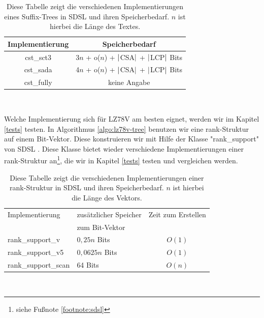 \documentclass[a4paper,11pt]{scrartcl}%
\theoremstyle{change}
\theoremstyle{nonumberplain}
\theoremstyle{change}
\theoremstyle{nonumberplain}
\theoremstyle{change}
\theoremstyle{nonumberplain}
\begin{document}
\begin{table}[h]
		\begin{center}
		
		\begin{tabular}[h]{|c|c|}\hline
			Implementierung & Speicherbedarf   \\ \hline
 		 	cst\_sct3 &  3$n$ + o($n$) + $\arrowvert$CSA$\arrowvert$ + $\arrowvert$LCP$\arrowvert$ Bits \\ \hline
 		 	cst\_sada &  4$n$ + o($n$) + $\arrowvert$CSA$\arrowvert$ + $\arrowvert$LCP$\arrowvert$ Bits \\ \hline
 		 	cst\_fully & keine Angabe \\ \hline
		\end{tabular} \\
		
		
		
		\end{center} 
		
		\caption{Diese Tabelle zeigt die verschiedenen Implementierungen eines Suffix-Trees in SDSL und ihren Speicherbedarf. $n$ ist hierbei die Länge des Textes. }
\end{table}

Welche Implementierung sich für LZ78V am besten eignet, werden wir im Kapitel \ref{tests} testen. 
\newline
In Algorithmus \ref{algo:lz78v-tree} benutzen wir eine rank-Struktur auf einem Bit-Vektor. Diese konstruieren wir mit Hilfe der Klasse "rank\_support" von SDSL \cite{sdsl}.
Diese Klasse bietet wieder verschiedene Implementierungen einer rank-Struktur an\footnote{siehe Fußnote \ref{footnote:sdsl}}, die wir in Kapitel \ref{tests} testen und vergleichen werden.

\begin{table}[h]
		\begin{center}
		
		\begin{tabular}[h]{|l|l|c|}\hline
			Implementierung & zusätzlicher Speicher & Zeit zum Erstellen\\
							&	zum Bit-Vektor		&		   \\ \hline
 		 	rank\_support\_v &  $0,25n$ Bits & $O(1)$\\ \hline
 		 	rank\_support\_v5 & $0,0625n$ Bits & $O(1)$\\ \hline
 		 	rank\_support\_scan & 64 Bits & $O(n)$\\ \hline
		\end{tabular} \\
		
		
		
		\end{center} 
		
		\caption{Diese Tabelle zeigt die verschiedenen Implementierungen einer rank-Struktur in SDSL und ihren Speicherbedarf. $n$ ist hierbei die Länge des Vektors.  }
\end{table}
\end{document}
